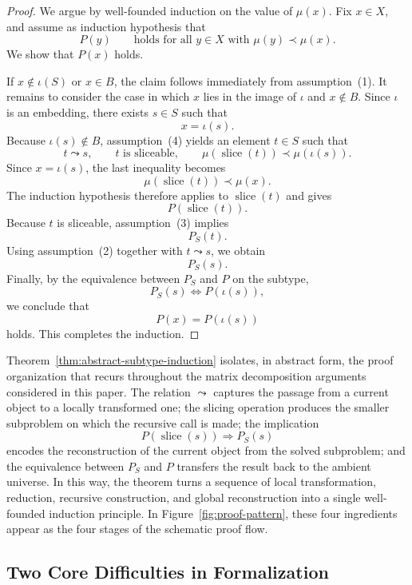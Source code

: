 \documentclass[pdflatex,sn-mathphys-num]{sn-jnl}%
\theoremstyle{thmstyleone}%
\theoremstyle{thmstyletwo}%
\theoremstyle{thmstylethree}%
\begin{document}
\begin{proof}
We argue by well-founded induction on the value of $\mu(x)$. Fix $x \in X$, and assume as induction hypothesis that
\[
P(y)
\qquad
\text{holds for all } y \in X \text{ with } \mu(y) \prec \mu(x).
\]
We show that $P(x)$ holds.

If $x \notin \iota(S)$ or $x \in B$, the claim follows immediately from assumption~(1). It remains to consider the case in which $x$ lies in the image of $\iota$ and $x \notin B$. Since $\iota$ is an embedding, there exists $s \in S$ such that
\[
x = \iota(s).
\]
Because $\iota(s) \notin B$, assumption~(4) yields an element $t \in S$ such that
\[
t \leadsto s,
\qquad
t \text{ is sliceable},
\qquad
\mu(\operatorname{slice}(t)) \prec \mu(\iota(s)).
\]
Since $x=\iota(s)$, the last inequality becomes
\[
\mu(\operatorname{slice}(t)) \prec \mu(x).
\]
The induction hypothesis therefore applies to $\operatorname{slice}(t)$ and gives
\[
P(\operatorname{slice}(t)).
\]
Because $t$ is sliceable, assumption~(3) implies
\[
P_S(t).
\]
Using assumption~(2) together with $t \leadsto s$, we obtain
\[
P_S(s).
\]
Finally, by the equivalence between $P_S$ and $P$ on the subtype,
\[
P_S(s) \Longleftrightarrow P(\iota(s)),
\]
we conclude that
\[
P(x)=P(\iota(s))
\]
holds. This completes the induction.
\end{proof}

Theorem~\ref{thm:abstract-subtype-induction} isolates, in abstract form, the proof organization that recurs throughout the matrix decomposition arguments considered in this paper. The relation $\leadsto$ captures the passage from a current object to a locally transformed one; the slicing operation produces the smaller subproblem on which the recursive call is made; the implication
\[
P(\operatorname{slice}(s)) \Longrightarrow P_S(s)
\]
encodes the reconstruction of the current object from the solved subproblem; and the equivalence between $P_S$ and $P$ transfers the result back to the ambient universe. In this way, the theorem turns a sequence of local transformation, reduction, recursive construction, and global reconstruction into a single well-founded induction principle. In Figure~\ref{fig:proof-pattern}, these four ingredients appear as the four stages of the schematic proof flow.

\subsection{Two Core Difficulties in Formalization}
\end{document}
